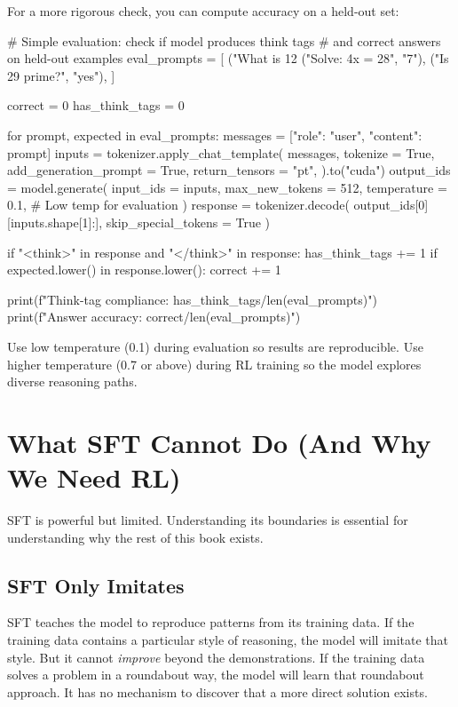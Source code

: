 \begin{chapterenv}
For a more rigorous check, you can compute accuracy on a held-out set:

\begin{codeblock}[python]
# Simple evaluation: check if model produces think tags
# and correct answers on held-out examples
eval_prompts = [
    ("What is 12%
    ("Solve: 4x = 28", "7"),
    ("Is 29 prime?", "yes"),
]

correct = 0
has_think_tags = 0

for prompt, expected in eval_prompts:
    messages = [{"role": "user", "content": prompt}]
    inputs = tokenizer.apply_chat_template(
        messages,
        tokenize = True,
        add_generation_prompt = True,
        return_tensors = "pt",
    ).to("cuda")
    output_ids = model.generate(
        input_ids = inputs,
        max_new_tokens = 512,
        temperature = 0.1,  # Low temp for evaluation
    )
    response = tokenizer.decode(
        output_ids[0][inputs.shape[1]:],
        skip_special_tokens = True
    )

    if "<think>" in response and "</think>" in response:
        has_think_tags += 1
    if expected.lower() in response.lower():
        correct += 1

print(f"Think-tag compliance: {has_think_tags}/{len(eval_prompts)}")
print(f"Answer accuracy: {correct}/{len(eval_prompts)}")
\end{codeblock}

\begin{tipbox}
Use low temperature (0.1) during evaluation so results are reproducible. Use higher temperature (0.7 or above) during RL training so the model explores diverse reasoning paths.
\end{tipbox}

\section{What SFT Cannot Do (And Why We Need RL)}

SFT is powerful but limited. Understanding its boundaries is essential for understanding why the rest of this book exists.

\subsection{SFT Only Imitates}

SFT teaches the model to reproduce patterns from its training data. If the training data contains a particular style of reasoning, the model will imitate that style. But it cannot \textit{improve} beyond the demonstrations. If the training data solves a problem in a roundabout way, the model will learn that roundabout approach. It has no mechanism to discover that a more direct solution exists.


\end{chapterenv}
